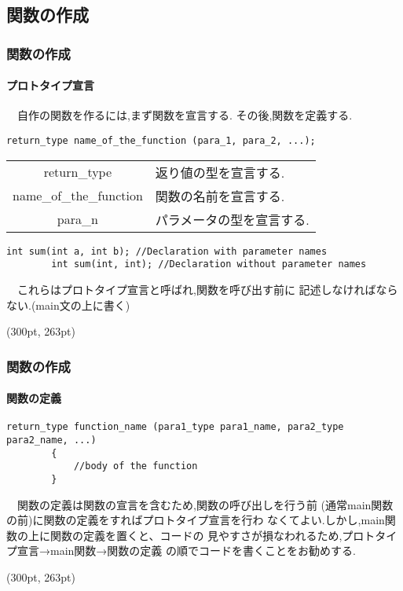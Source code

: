 \documentclass[dvipdfmx]{beamer}
\begin{document}
\subsection{関数の作成}
\begin{frame}[t, fragile, label=45]
    \frametitle{関数の作成}
    \framesubtitle{プロトタイプ宣言}
    　自作の関数を作るには,まず関数を宣言する.
    その後,関数を定義する.
    \begin{lstlisting}[gobble=8, 
        caption=Syntax\space of\space function\space declaration]
        return_type name_of_the_function (para_1, para_2, ...);
    \end{lstlisting}
    \begin{table}
    \centering
        \begin{tabular}{cl}
            \hline
            return\_type & 返り値の型を宣言する.\\
            name\_of\_the\_function & 関数の名前を宣言する.\\
            para\_n & パラメータの型を宣言する.\\
            \hline
        \end{tabular}
    \end{table}
    \begin{lstlisting}[gobble=8, 
        caption=Example\space of \space function\space declaration]
        int sum(int a, int b); //Declaration with parameter names
        int sum(int, int); //Declaration without parameter names
    \end{lstlisting}
    　これらはプロトタイプ宣言と呼ばれ,関数を呼び出す前に
    記述しなければならない.(main文の上に書く)
    \begin{textblock*}{0.3\linewidth}(300pt, 263pt)
    \hyperlink{44}{}
    \space
    \hyperlink{46}{}
    \end{textblock*}
\end{frame}

\begin{frame}[t, fragile, label=46]
	\frametitle{関数の作成}
	\framesubtitle{関数の定義}
	\begin{lstlisting}[gobble=8, caption=Syntax\space of\space function
        \space definition]
        return_type function_name (para1_type para1_name, para2_type para2_name, ...)
        {
            //body of the function
        }
    \end{lstlisting}
    　関数の定義は関数の宣言を含むため,関数の呼び出しを行う前
        (通常main関数の前)に関数の定義をすればプロトタイプ宣言を行わ
        なくてよい.しかし,main関数の上に関数の定義を置くと、コードの
        見やすさが損なわれるため,プロトタイプ宣言→main関数→関数の定義
        の順でコードを書くことをお勧めする.
    \begin{textblock*}{0.3\linewidth}(300pt, 263pt)
    \hyperlink{45}{}
    \space
    \hyperlink{47}{}
    \end{textblock*}
\end{frame}
\end{document}
